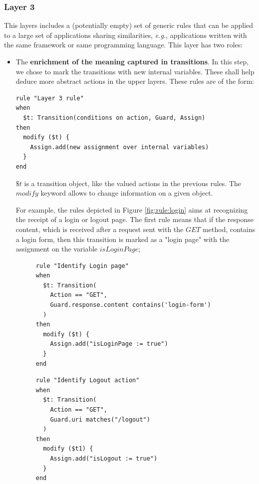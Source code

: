 \subsubsection{Layer 3}

This layers includes a (potentially empty) set of generic rules
that can be applied to a large set of applications sharing
similarities, \emph{e.g.}, applications written with the same framework
or same programming language.  This layer has two roles:

\begin{itemize}
\item The \textbf{enrichment of the meaning captured in
    transitions}. In this step, we chose to mark the transitions
    with new internal variables. These shall help deduce more
    abstract actions in the upper layers. These rules are of the
    form:

\begin{BVerbatim}
rule "Layer 3 rule"
when
  $t: Transition(conditions on action, Guard, Assign)
then
  modify ($t) {
    Assign.add(new assignment over internal variables)
  }
end
\end{BVerbatim}

$\$t$ is a transition object, like the valued actions in the
previous rules. The $modify$ keyword allows to change information
on a given object.

For example, the rules depicted in Figure \ref{fig:rule:login}
aims at recognizing the receipt of a login or logout page. The
first rule means that if the response content, which is received
after a request sent with the $GET$ method, contains a login
form, then this transition is marked as a "login page" with the
assignment on the variable $isLoginPage$;

\begin{figure}[h]
\begin{framed}
\begin{BVerbatim}
rule "Identify Login page"
when
  $t: Transition(
    Action == "GET",
    Guard.response.content contains('login-form')
  )
then
  modify ($t) {
    Assign.add("isLoginPage := true")
  }
end
\end{BVerbatim}
\end{framed}

\begin{framed}
\begin{BVerbatim}
rule "Identify Logout action"
when
  $t: Transition(
    Action == "GET",
    Guard.uri matches("/logout")
  )
then
  modify ($t1) {
    Assign.add("isLogout := true")
  }
end
\end{BVerbatim}
\end{framed}


\end{figure}
\end{itemize}
